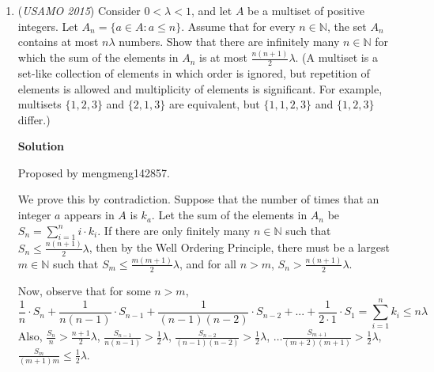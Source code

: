 \begin{enumerate}
 If $ac+bd$ were prime,

 We have $ac+bd-(cd+ab)=(a-d)(c-b)>0$

 Which means that  $ac+bd>cd+ab>cd-ab$ and neither $cd+ab$ nor $cd-ab$ can be multiples of $ac+bd$ meaning $e$ must be a multiple of $ac+bd$ and $e=k(ac+bd)$ for some integer $k$

 But clearly this is impossible since $(k(ac+bd))^5>a^4+b^4$.

 Therefore, by contradiction, $ac+bd$ is composite.

 


	\item (\textit{USAMO 2015}) Consider $0<\lambda<1$, and let $A$ be a multiset of positive integers. Let $A_n=\{a\in A: a\leq n\}$. Assume that for every $n\in\mathbb{N}$, the set $A_n$ contains at most $n\lambda$ numbers. Show that there are infinitely many $n\in\mathbb{N}$ for which the sum of the elements in $A_n$ is at most $\frac{n(n+1)}{2}\lambda$. (A multiset is a set-like collection of elements in which order is ignored, but repetition of elements is allowed and multiplicity of elements is significant. For example, multisets $\{1, 2, 3\}$ and $\{2, 1, 3\}$ are equivalent, but $\{1, 1, 2, 3\}$ and $\{1, 2, 3\}$ differ.)


 



\textbf{Solution}

Proposed by mengmeng142857.

 We prove this by contradiction. Suppose that the number of times that an integer $a$ appears in $A$ is $k_a$. Let the sum of the elements in $A_n$ be $S_n=\sum_{i=1}^{n}i\cdot k_i$. If there are only finitely many $n\in\mathbb{N}$ such that $S_n\leq\frac{n(n+1)}{2}\lambda$, then by the Well Ordering Principle, there must be a largest $m\in\mathbb{N}$ such that $S_m\leq\frac{m(m+1)}{2}\lambda$, and for all $n>m$, $S_n>\frac{n(n+1)}{2}\lambda$.

 Now, observe that for some $n>m$,
 \[\frac{1}{n}\cdot S_{n}+\frac{1}{n(n-1)}\cdot S_{n-1}+\frac{1}{(n-1)(n-2)}\cdot S_{n-2}+...+\frac{1}{2\cdot1}\cdot S_{1} =\sum_{i=1}^{n}k_i \leq n\lambda\]Also, $\frac{S_{n}}{n}>\frac{n+1}{2}\lambda$, $\frac{S_{n-1}}{n(n-1)}>\frac{1}{2}\lambda$, $\frac{S_{n-2}}{(n-1)(n-2)}>\frac{1}{2}\lambda$, $\hdots$$\frac{S_{m+1}}{(m+2)(m+1)}>\frac{1}{2}\lambda$, $\frac{S_{m}}{(m+1)m}\leq \frac{1}{2}\lambda$.


\end{enumerate}
